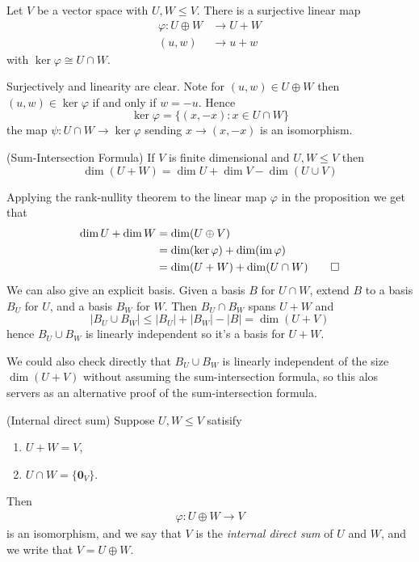 \documentclass{article}
\begin{document}
\begin{proposition}
  Let $ V $ be a vector space with $ U,W\le V $. There is a surjective linear map
  \begin{align*}
	  \varphi: U\oplus W &\to U+W\\
	  (u,w) &\to u+w
  \end{align*}
  with $ \ker\varphi\cong U\cap W $.
\end{proposition}
\pf Surjectively and linearity are clear. Note for $ (u,w)\in U\oplus W $ then $ (u,w)\in\ker\varphi $ if and only if $ w=-u $. Hence
\[
	\ker\varphi=\{(x,-x):x\in U\cap W\}
\]
the map $ \psi:U\cap W\to \ker\varphi $ sending $ x\to(x,-x) $ is an isomorphism.
\begin{corollary}
	(Sum-Intersection Formula) If $ V $ is finite dimensional and $ U,W\le V $ then
	\[
	  \dim (U+W)=\dim U + \dim V-\dim(U\cup V)
	\]
\end{corollary}
Applying the rank-nullity theorem to the linear map $ \varphi $ in the proposition we get that
\begin{align*}
	\dim U + \dim W&=\dim (U\oplus V)\\
		       &=\dim(\ker\varphi)+\dim(\operatorname{im}\varphi)\\
		       &=\dim(U+W)+\dim(U\cap W)\qed
\end{align*}
We can also give an explicit basis. Given a basis $ B $ for $ U\cap W $, extend $ B $ to a basis $ B_U $ for $ U $, and a basis $ B_W $ for $ W $. Then $ B_U\cap B_W $ spans $ U+W $ and
\[
  |B_U\cup B_W|\le |B_U|+|B_W|-|B|=\dim(U+V)
\]
hence $ B_U\cup B_W $ is linearly independent so it's a basis for $ U+W $.
\begin{remark}
We could also check directly that $ B_U\cup B_W $ is linearly independent of the size $ \dim(U+V) $ without assuming the sum-intersection formula, so this alos servers as an alternative proof of the sum-intersection formula.
\end{remark}
\begin{definition}
	(Internal direct sum) Suppose $ U,W\le V $ satisify 
	\begin{enumerate}
		\item $ U+W=V $,
		\item $ U\cap W=\{\mathbf 0_V\} $.
	\end{enumerate}
	Then 
	\begin{align*}
	  \varphi: U\oplus W\to V
	\end{align*}
	is an isomorphism, and we say that $ V $ is the \textit{internal direct sum} of $ U $ and $ W $, and we write that $ V=U\oplus W $.
\end{definition}
\end{document}
